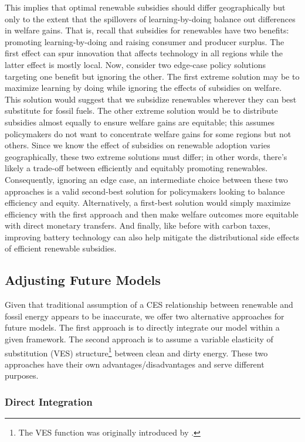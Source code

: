 \documentclass[11pt,a4paper,leqno]{extarticle}
\begin{document}
	This implies that optimal renewable subsidies should differ geographically but only to the extent that the spillovers of learning-by-doing balance out differences in welfare gains. That is, recall that subsidies for renewables have two benefits: promoting learning-by-doing and raising consumer and producer surplus. The first effect  can spur innovation that affects technology in all regions while the latter effect is mostly local. Now, consider two edge-case policy solutions targeting one benefit but ignoring the other. The first extreme solution may be to maximize learning by doing while ignoring the effects of subsidies on welfare. This solution would suggest that we subsidize renewables wherever they can best substitute for fossil fuels. The other extreme solution would be to distribute subsidies almost equally to ensure welfare gains are equitable; this assumes policymakers do not want to concentrate welfare gains for some regions but not others. Since we know the effect of subsidies on renewable adoption varies geographically, these two extreme solutions must differ; in other words, there's likely a trade-off between efficiently and equitably promoting renewables. Consequently, ignoring an edge case, an intermediate choice between these two approaches is a valid second-best solution for policymakers looking to balance efficiency and equity. Alternatively, a first-best solution would simply maximize efficiency with the first approach and then make welfare outcomes more equitable with direct monetary transfers. And finally, like before with carbon taxes, improving battery technology can also help mitigate the distributional side effects of efficient renewable subsidies. 
	
	\subsection{Adjusting Future Models}
	
	Given that traditional assumption of a CES relationship between renewable and fossil energy appears to be inaccurate, we offer two alternative approaches for future models. The first approach is to directly integrate our model within a given framework. The second approach is to assume a variable elasticity of substitution (VES) structure\footnote{ The VES function was originally introduced by \citet{VES}.} between clean and dirty energy. These two approaches have their own advantages/disadvantages and serve different purposes. 
	
	\subsubsection{Direct Integration}
	
\end{document}
